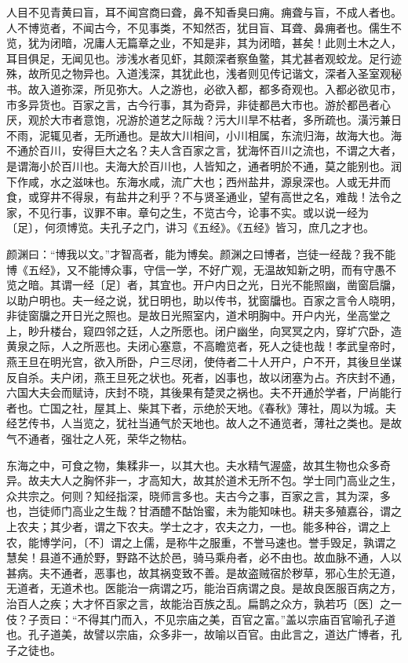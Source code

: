 \documentclass[]{article}
\begin{document}
人目不见青黄曰盲，耳不闻宫商曰聋，鼻不知香臭曰痈。痈聋与盲，不成人者也。人不博览者，不闻古今，不见事类，不知然否，犹目盲、耳聋、鼻痈者也。儒生不览，犹为闭暗，况庸人无篇章之业，不知是非，其为闭暗，甚矣！此则土木之人，耳目俱足，无闻见也。涉浅水者见虾，其颇深者察鱼鳖，其尤甚者观蛟龙。足行迹殊，故所见之物异也。入道浅深，其犹此也，浅者则见传记谐文，深者入圣室观秘书。故入道弥深，所见弥大。人之游也，必欲入都，都多奇观也。入都必欲见市，市多异货也。百家之言，古今行事，其为奇异，非徒都邑大市也。游於都邑者心厌，观於大市者意饱，况游於道艺之际哉？污大川旱不枯者，多所疏也。潢污兼日不雨，泥辄见者，无所通也。是故大川相间，小川相属，东流归海，故海大也。海不通於百川，安得巨大之名？夫人含百家之言，犹海怀百川之流也，不谓之大者，是谓海小於百川也。夫海大於百川也，人皆知之，通者明於不通，莫之能别也。润下作咸，水之滋味也。东海水咸，流广大也；西州盐井，源泉深也。人或无井而食，或穿井不得泉，有盐井之利乎？不与贤圣通业，望有高世之名，难哉！法令之家，不见行事，议罪不审。章句之生，不览古今，论事不实。或以说一经为〔足〕，何须博览。夫孔子之门，讲习《五经》。《五经》皆习，庶几之才也。

颜渊曰：``博我以文。''才智高者，能为博矣。颜渊之曰博者，岂徒一经哉？我不能博《五经》，又不能博众事，守信一学，不好广观，无温故知新之明，而有守愚不览之暗。其谓一经〔足〕者，其宜也。开户内日之光，日光不能照幽，凿窗启牖，以助户明也。夫一经之说，犹日明也，助以传书，犹窗牖也。百家之言令人晓明，非徒窗牖之开日光之照也。是故日光照室内，道术明胸中。开户内光，坐高堂之上，眇升楼台，窥四邻之廷，人之所愿也。闭户幽坐，向冥冥之内，穿圹穴卧，造黄泉之际，人之所恶也。夫闭心塞意，不高瞻览者，死人之徒也哉！孝武皇帝时，燕王旦在明光宫，欲入所卧，户三尽闭，使侍者二十人开户，户不开，其後旦坐谋反自杀。夫户闭，燕王旦死之状也。死者，凶事也，故以闭塞为占。齐庆封不通，六国大夫会而赋诗，庆封不晓，其後果有楚灵之祸也。夫不开通於学者，尸尚能行者也。亡国之社，屋其上、柴其下者，示绝於天地。《春秋》薄社，周以为城。夫经艺传书，人当览之，犹社当通气於天地也。故人之不通览者，薄社之类也。是故气不通者，强壮之人死，荣华之物枯。

东海之中，可食之物，集糅非一，以其大也。夫水精气渥盛，故其生物也众多奇异。故夫大人之胸怀非一，才高知大，故其於道术无所不包。学士同门高业之生，众共宗之。何则？知经指深，晓师言多也。夫古今之事，百家之言，其为深，多也，岂徒师门高业之生哉？甘酒醴不酤饴蜜，未为能知味也。耕夫多殖嘉谷，谓之上农夫；其少者，谓之下农夫。学士之才，农夫之力，一也。能多种谷，谓之上农，能博学问，〔不〕谓之上儒，是称牛之服重，不誉马速也。誉手毁足，孰谓之慧矣！县道不通於野，野路不达於邑，骑马乘舟者，必不由也。故血脉不通，人以甚病。夫不通者，恶事也，故其祸变致不善。是故盗贼宿於秽草，邪心生於无道，无道者，无道术也。医能治一病谓之巧，能治百病谓之良。是故良医服百病之方，治百人之疾；大才怀百家之言，故能治百族之乱。扁鹊之众方，孰若巧〔医〕之一伎？子贡曰：``不得其门而入，不见宗庙之美，百官之富。''盖以宗庙百官喻孔子道也。孔子道美，故譬以宗庙，众多非一，故喻以百官。由此言之，道达广博者，孔子之徒也。
\end{document}
